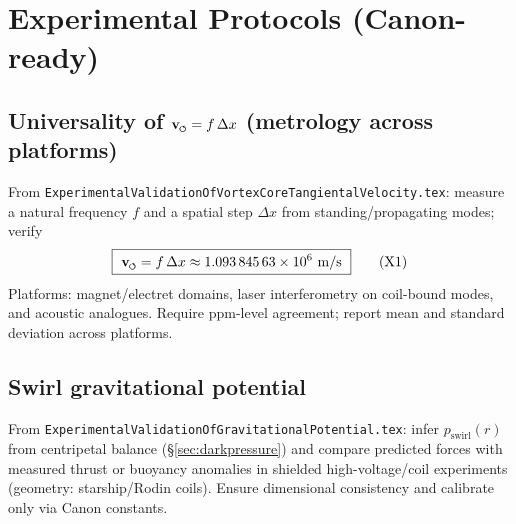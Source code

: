 \documentclass[11pt]{article}
\begin{document}
        \section{Experimental Protocols (Canon-ready)}
        \label{sec:experiments}

        \subsection*{Universality of $\vswirl = f\,\Delta x$ (metrology across platforms)}
            From \texttt{ExperimentalValidationOfVortexCoreTangientalVelocity.tex}: measure a natural frequency $f$ and a spatial step $\Delta x$ from standing/propagating modes; verify
            \begin{equation}
            \boxed{\ \vswirl = f\,\Delta x \approx \num{1.09384563e6}\ \si{m/s}\ } \tag{X1}
            \end{equation}
            Platforms: magnet/electret domains, laser interferometry on coil-bound modes, and acoustic analogues. Require ppm-level agreement; report mean and standard deviation across platforms.

        \subsection*{Swirl gravitational potential}
            From \texttt{ExperimentalValidationOfGravitationalPotential.tex}: infer $p_{\text{swirl}}(r)$ from centripetal balance (\S\ref{sec:darkpressure}) and compare predicted forces with measured thrust or buoyancy anomalies in shielded high-voltage/coil experiments (geometry: starship/Rodin coils). Ensure dimensional consistency and calibrate only via Canon constants.



\appendix

\end{document}
